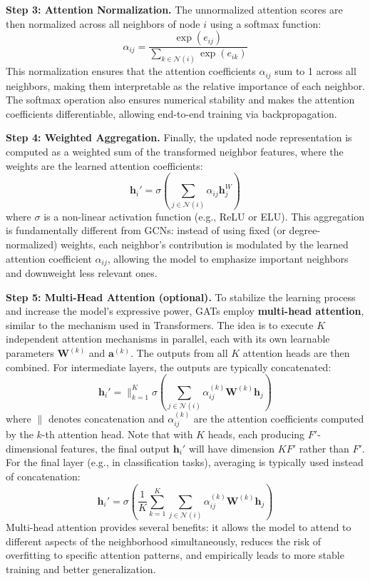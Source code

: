 \begin{compactitemize}
\item \textbf{Step 3: Attention Normalization.} The unnormalized attention scores are then normalized across all neighbors of node $i$ using a softmax function:
$$\alpha_{ij} = \frac{\exp(e_{ij})}{\sum_{k \in \mathcal{N}(i)} \exp(e_{ik})}$$
This normalization ensures that the attention coefficients $\alpha_{ij}$ sum to 1 across all neighbors, making them interpretable as the relative importance of each neighbor. The softmax operation also ensures numerical stability and makes the attention coefficients differentiable, allowing end-to-end training via backpropagation.

\item \textbf{Step 4: Weighted Aggregation.} Finally, the updated node representation is computed as a weighted sum of the transformed neighbor features, where the weights are the learned attention coefficients:
$$\mathbf{h}_i' = \sigma\left(\sum_{j \in \mathcal{N}(i)} \alpha_{ij} \mathbf{h}_j^W\right)$$
where $\sigma$ is a non-linear activation function (e.g., ReLU or ELU). This aggregation is fundamentally different from GCNs: instead of using fixed (or degree-normalized) weights, each neighbor's contribution is modulated by the learned attention coefficient $\alpha_{ij}$, allowing the model to emphasize important neighbors and downweight less relevant ones.

\item \textbf{Step 5: Multi-Head Attention (optional).} To stabilize the learning process and increase the model's expressive power, GATs employ \textbf{multi-head attention}, similar to the mechanism used in Transformers. The idea is to execute $K$ independent attention mechanisms in parallel, each with its own learnable parameters $\mathbf{W}^{(k)}$ and $\mathbf{a}^{(k)}$. The outputs from all $K$ attention heads are then combined. For intermediate layers, the outputs are typically concatenated:
$$\mathbf{h}_i' = \|_{k=1}^K \sigma\left(\sum_{j \in \mathcal{N}(i)} \alpha_{ij}^{(k)} \mathbf{W}^{(k)} \mathbf{h}_j\right)$$
where $\|$ denotes concatenation and $\alpha_{ij}^{(k)}$ are the attention coefficients computed by the $k$-th attention head. Note that with $K$ heads, each producing $F'$-dimensional features, the final output $\mathbf{h}_i'$ will have dimension $KF'$ rather than $F'$. For the final layer (e.g., in classification tasks), averaging is typically used instead of concatenation:
$$\mathbf{h}_i' = \sigma\left(\frac{1}{K} \sum_{k=1}^K \sum_{j \in \mathcal{N}(i)} \alpha_{ij}^{(k)} \mathbf{W}^{(k)} \mathbf{h}_j\right)$$
Multi-head attention provides several benefits: it allows the model to attend to different aspects of the neighborhood simultaneously, reduces the risk of overfitting to specific attention patterns, and empirically leads to more stable training and better generalization.
\end{compactitemize}

